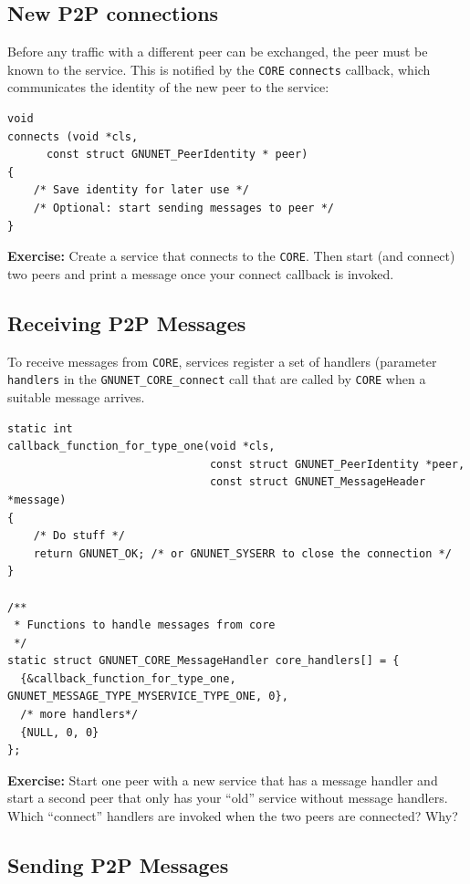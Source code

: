 \documentclass[10pt]{article}
\newcommand{\exercise}[1]{\noindent\begin{boxedminipage}{\textwidth}{\bf Exercise:} #1 \end{boxedminipage}}
\begin{document}
\subsection{New P2P connections}

Before any traffic with a different peer can be exchanged, the peer must be
known to the service. This is notified by the \texttt{CORE} {\tt connects} callback,
which communicates the identity of the new peer to the service:

\lstset{language=C}
\begin{lstlisting}
void
connects (void *cls,
	  const struct GNUNET_PeerIdentity * peer)
{
    /* Save identity for later use */
    /* Optional: start sending messages to peer */
}
\end{lstlisting}

\exercise{Create a service that connects to the \texttt{CORE}.  Then
start (and connect) two peers and print a message once your connect
callback is invoked.}

\subsection{Receiving P2P Messages}

To receive messages from \texttt{CORE}, services register a set of handlers
(parameter {\tt *handlers} in the \lstinline|GNUNET_CORE_connect| call that are called by \texttt{CORE}
when a suitable message arrives.

\lstset{language=c}
\begin{lstlisting}
static int
callback_function_for_type_one(void *cls,
                               const struct GNUNET_PeerIdentity *peer,
                               const struct GNUNET_MessageHeader *message)
{
    /* Do stuff */
    return GNUNET_OK; /* or GNUNET_SYSERR to close the connection */
}

/**
 * Functions to handle messages from core
 */
static struct GNUNET_CORE_MessageHandler core_handlers[] = {
  {&callback_function_for_type_one, GNUNET_MESSAGE_TYPE_MYSERVICE_TYPE_ONE, 0},
  /* more handlers*/
  {NULL, 0, 0}
};
\end{lstlisting}

\exercise{Start one peer with a new service that has a message
handler and start a second peer that only has your ``old'' service
without message handlers.  Which ``connect'' handlers are invoked when
the two peers are connected?  Why?}


\subsection{Sending P2P Messages}
\end{document}
